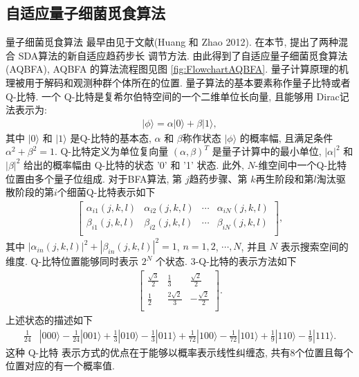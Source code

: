 \subsection{自适应量子细菌觅食算法}
量子细菌觅食算法 最早由见于文献(Huang 和 Zhao 2012). 在本节, 提出了两种混合 SDA算法的新自适应趋药步长 调节方法. 由此得到了自适应量子细菌觅食算法 (AQBFA), AQBFA 的算法流程图见图 \ref{fig:FlowchartAQBFA}.
量子计算原理的机理被用于解码和观测种群个体所在的位置. 量子算法的基本要素称作量子比特或者 Q-比特. 一个 Q-比特是复希尔伯特空间的一个二维单位长向量, 且能够用 Dirac记法表示为:
\begin{gather}
    |\phi\rangle=\alpha|0\rangle+\beta |1\rangle,
\end{gather}
其中 $|0\rangle$ 和 $|1\rangle$ 是Q-比特的基本态, $\alpha$ 和  $\beta$称作状态 $|\phi\rangle$ 的概率幅, 且满足条件 $\alpha^2+\beta^2=1$.
Q-比特定义为单位复向量 $(\alpha,\beta)^T$ 是量子计算中的最小单位, $|\alpha|^2$ 和 $|\beta|^2$ 给出的概率幅由 Q-比特的状态 '0' 和 '1' 状态.
此外, $N$-维空间中一个Q-比特位置由多个量子位组成.
对于BFA算法, 第 $j$趋药步骤、第 $k$再生阶段和第$l$淘汰驱散阶段的第$i$个细菌Q-比特表示如下
\begin{align}
\begin{bmatrix}
    \alpha_{i1}(j,k,l) &  \alpha_{i2}(j,k,l)  &  \cdots&  \alpha_{iN}(j,k,l)\\
    \beta_{i1}(j,k,l)&  \beta_{i2}(j,k,l)&  \cdots &  \beta_{iN}(j,k,l)\\
\end{bmatrix},
\end{align}
其中 $|\alpha_{in}(j,k,l)|^2+|\beta_{in}(j,k,l)|^2=1$, $n=1, 2$, $\cdots, N$, 并且 $N$ 表示搜索空间的维度.
Q-比特位置能够同时表示 $2^N$ 个状态. 3-Q-比特的表示方法如下
\begin{align*}
\begin{bmatrix}
\frac{\sqrt{3}}{2} &  \frac{1}{3}&  \frac{\sqrt{2}}{2}\\
\frac{1}{2}&  \frac{2\sqrt{2}}{3}&  -\frac{\sqrt{2}}{2}\\
\end{bmatrix}.
\end{align*}
上述状态的描述如下
\begin{align}
  \frac{1}{24}&|0 0 0\rangle-\frac{1}{24}|0 0 1\rangle+\frac{1}{3}|0 10\rangle-\frac{1}{3}|0 11\rangle
    +\frac{1}{72}|100\rangle-\frac{1}{72}|1 01\rangle+\frac{1}{9}|1 10\rangle-\frac{1}{9}|1 11\rangle.
\end{align}
这种 Q-比特 表示方式的优点在于能够以概率表示线性纠缠态, 共有8个位置且每个位置对应的有一个概率值.

